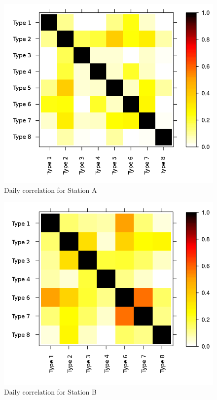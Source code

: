 \begin{figure}[htb]
 \centering
 \includegraphics[width=\textwidth]{./img/albacete_corr.png}
 \caption{Daily correlation for Station A} \label{fig:albacete_corr}
\end{figure}
\begin{figure}[htb]
 \centering
 \includegraphics[width=\textwidth]{./img/antequera_corr.png}
 \caption{Daily correlation for Station B} \label{fig:anteq_corr}
\end{figure}
